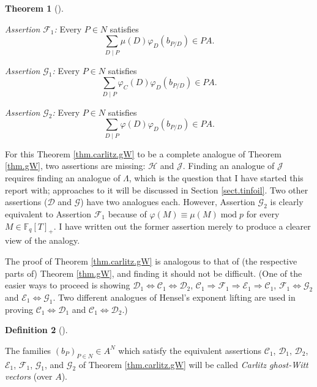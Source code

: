 \documentclass[numbers=enddot,12pt,final,onecolumn,notitlepage]{scrartcl}%
\theoremstyle{definition}
\newtheorem{theo}{Theorem}[section]
\newenvironment{theorem}[1][]
{\begin{theo}[#1]\begin{leftbar}}
{\end{leftbar}\end{theo}}
\newtheorem{defi}[theo]{Definition}
\newenvironment{definition}[1][]
{\begin{defi}[#1]\begin{leftbar}}
{\end{leftbar}\end{defi}}
\let\sumnonlimits\sum
\renewcommand{\sum}{\sumnonlimits\limits}
\begin{document}
\begin{theorem}
\textit{Assertion }$\mathcal{F}_{1}$\textit{:} Every $P\in N$ satisfies%
\[
\sum_{D\mid P}\mu\left(  D\right)  \varphi_{D}\left(  b_{P / D}\right)  \in
PA.
\]


\textit{Assertion }$\mathcal{G}_{1}$\textit{:} Every $P\in N$ satisfies%
\[
\sum_{D\mid P}\varphi_{C}\left(  D\right)  \varphi_{D}\left(  b_{P /
D}\right)  \in PA.
\]


\textit{Assertion }$\mathcal{G}_{2}$\textit{:} Every $P\in N$ satisfies%
\[
\sum_{D\mid P}\varphi\left(  D\right)  \varphi_{D}\left(  b_{P / D}\right)
\in PA.
\]

\end{theorem}

For this Theorem \ref{thm.carlitz.gW} to be a complete analogue of Theorem
\ref{thm.gW}, two assertions are missing: $\mathcal{H}$ and $\mathcal{J}$.
Finding an analogue of $\mathcal{J}$ requires finding an analogue of $\Lambda
$, which is the question that I have started this report with; approaches to
it will be discussed in Section \ref{sect.tinfoil}. Two other assertions
($\mathcal{D}$ and $\mathcal{G}$) have two analogues each. However, Assertion
$\mathcal{G}_{2}$ is clearly equivalent to Assertion $\mathcal{F}_{1}$ because
of $\varphi\left(  M\right)  \equiv\mu\left(  M\right)  \operatorname{mod}p$
for every $M\in\mathbb{F}_{q}\left[  T\right]  _{+}$. I have written out the
former assertion merely to produce a clearer view of the analogy.

The proof of Theorem \ref{thm.carlitz.gW} is analogous to that of (the
respective parts of) Theorem \ref{thm.gW}, and finding it should not be
difficult. (One of the easier ways to proceed is showing $\mathcal{D}%
_{1}\Longleftrightarrow\mathcal{C}_{1}\Longleftrightarrow\mathcal{D}_{2}$,
$\mathcal{C}_{1}\Longrightarrow\mathcal{F}_{1}\Longrightarrow\mathcal{E}%
_{1}\Longrightarrow\mathcal{C}_{1}$, $\mathcal{F}_{1}\Longleftrightarrow
\mathcal{G}_{2}$ and $\mathcal{E}_{1}\Longleftrightarrow\mathcal{G}_{1}$. Two
different analogues of Hensel's exponent lifting are used in proving
$\mathcal{C}_{1}\Longleftrightarrow\mathcal{D}_{1}$ and $\mathcal{C}%
_{1}\Longleftrightarrow\mathcal{D}_{2}$.)

\begin{definition}
The families $\left(  b_{P}\right)  _{P\in N}\in A^{N}$ which satisfy the
equivalent assertions $\mathcal{C}_{1}$, $\mathcal{D}_{1}$, $\mathcal{D}_{2}$,
$\mathcal{E}_{1}$, $\mathcal{F}_{1}$, $\mathcal{G}_{1}$, and $\mathcal{G}_{2}$
of Theorem \ref{thm.carlitz.gW} will be called \textit{Carlitz ghost-Witt
vectors} (over $A$).
\end{definition}
\end{document}
